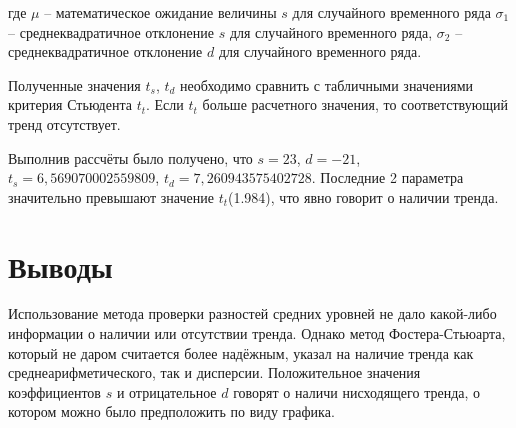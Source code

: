 \documentclass[a4paper,12pt]{article}
\begin{document}
 
где $\mu$ – математическое ожидание величины $s$ для случайного временного ряда $\sigma_1$ – среднеквадратичное отклонение $s$ для случайного временного ряда, $\sigma_2$ – среднеквадратичное отклонение $d$ для случайного временного ряда.

\vspace{0.5cm}
Полученные значения $t_s$, $t_d$ необходимо сравнить с табличными значениями критерия Стьюдента $t_t$. Если $t_t$ больше расчетного значения, то соответствующий тренд отсутствует.

\vspace{0.5cm}
Выполнив рассчёты было получено, что $s = 23$, $d = -21$, $t_s = 6,569070002559809$, $t_d = 7,260943575402728$. Последние 2 параметра значительно превышают значение $t_t$(1.984), что явно говорит о наличии тренда.

\newpage\section{Выводы}

Использование метода проверки разностей средних уровней не дало какой-либо информации о наличии или отсутствии тренда. Однако метод Фостера-Стьюарта, который не даром считается более надёжным, указал на наличие тренда как среднеарифметического, так и дисперсии. Положительное значения коэффициентов $s$ и отрицательное $d$ говорят о наличи нисходящего тренда, о котором можно было предположить по виду графика. 
\end{document}

